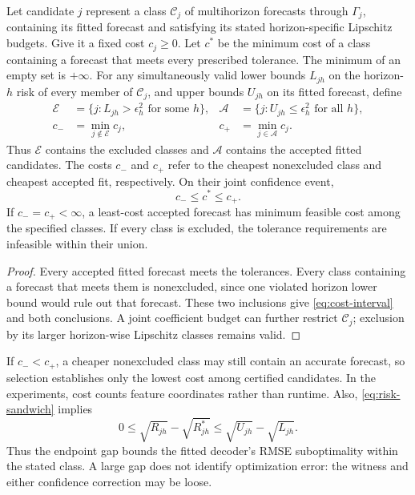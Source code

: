 \begin{corollary}
\label{cor:cost-optimality}
Let candidate $j$ represent a class $\mathcal C_j$ of multihorizon forecasts
through $\Gamma_j$, containing its fitted forecast and satisfying its stated horizon-specific
Lipschitz budgets. Give it a fixed cost $c_j\geq0$. Let $c^*$ be the minimum
cost of a class containing a forecast that meets every prescribed tolerance.
The minimum of an empty set is $+\infty$.
For any simultaneously valid lower bounds $L_{jh}$ on the horizon-$h$
risk of every member of $\mathcal C_j$, and upper bounds $U_{jh}$ on
its fitted forecast, define
\begin{align*}
 \mathcal E&=\{j:L_{jh}>\epsilon_h^2\text{ for some }h\},&
 \mathcal A&=\{j:U_{jh}\leq\epsilon_h^2\text{ for all }h\},\\
 c_-&=\min_{j\notin\mathcal E}c_j,&
 c_+&=\min_{j\in\mathcal A}c_j.
\end{align*}
Thus $\mathcal E$ contains the excluded classes and $\mathcal A$ contains
the accepted fitted candidates. The costs $c_-$ and $c_+$ refer to the
cheapest nonexcluded class and cheapest accepted fit, respectively.
On their joint confidence event,
\begin{equation}
 c_-\leq c^*\leq c_+.
 \label{eq:cost-interval}
\end{equation}
If $c_-=c_+<\infty$, a least-cost accepted forecast has minimum feasible
cost among the specified classes. If every class is excluded, the tolerance
requirements are infeasible within their union.
\end{corollary}

\begin{proof}
Every accepted fitted forecast meets the tolerances. Every class containing
a forecast that meets them is nonexcluded, since one violated horizon lower
bound would rule out that forecast. These two inclusions give
\eqref{eq:cost-interval} and both conclusions. A joint coefficient budget
can further restrict $\mathcal C_j$; exclusion by its larger horizon-wise
Lipschitz classes remains valid.
\end{proof}

If $c_-<c_+$, a cheaper nonexcluded class may still contain an accurate
forecast, so selection establishes only the lowest cost among certified
candidates. In the experiments, cost counts feature coordinates rather
than runtime.
Also, \eqref{eq:risk-sandwich} implies
\[
 0\leq\sqrt{R_{jh}}-\sqrt{R^*_{jh}}
       \leq\sqrt{U_{jh}}-\sqrt{L_{jh}}.
\]
Thus the endpoint gap bounds the fitted decoder's RMSE suboptimality within
the stated class. A large gap does not identify optimization error: the
witness and either confidence correction may be loose.

